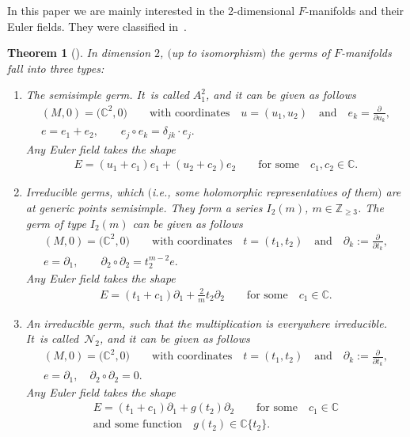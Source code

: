 \documentclass[10pt,a4paper]{amsart}
\numberwithin{equation}{section}
\numberwithin{figure}{section}
\newcommand{\Z}{{\mathbb Z}}
\newcommand{\C}{{\mathbb C}}
\newcommand{\NN}{{\mathcal N}}
\newcommand{\paa}{\partial}
\newtheorem{Theorem}{Theorem}[section]
\begin{document}
In this paper we are mainly interested in the 2-dimensional
$F$-manifolds and their Euler fields.
They were classified in~\cite{He02}.

\begin{Theorem}[{\cite[Theorem~4.7]{He02}}]\label{t2.2}
In dimension $2$, $($up to isomorphism$)$ the germs of
$F$-manifolds fall into three types:
\begin{enumerate}\itemsep=0pt
\item[$(a)$] The semisimple germ. It~is called $A_1^2$,
and it can be given as follows
\begin{gather*}
(M,0)=\big(\C^2,0\big)\qquad\text{with coordinates}\quad
u=(u_1,u_2)\quad\text{and}\quad e_k=\frac{\paa}{\paa u_k},
\\
e= e_1+e_2,\qquad e_j\circ e_k=\delta_{jk}\cdot e_j.
\end{gather*}
Any Euler field takes the shape
\begin{gather}\label{2.3}
E= (u_1+c_1)e_1+(u_2+c_2)e_2\qquad\text{for some}\quad
c_1,c_2\in\C.
\end{gather}

\item[$(b)$] Irreducible germs, which $($i.e., some holomorphic
representatives of them$)$ are at generic points semisimple.
They form a series $I_2(m)$, $m\in\Z_{\geq 3}$.
The germ of type $I_2(m)$ can be given as follows
\begin{gather*}
(M,0)=\big(\C^2,0\big)\qquad \text{with coordinates}\quad t=(t_1,t_2)\quad
\text{and}\quad\paa_k:=\frac{\paa}{\paa t_k},
\\
e=\paa_1,\qquad \paa_2\circ\paa_2 =t_2^{m-2}e.\label{2.4}
\end{gather*}
Any Euler field takes the shape
\begin{gather*}%
E= (t_1+c_1)\paa_1 + \frac{2}{m}t_2\paa_2
\qquad\text{for some}\quad c_1\in\C.
\end{gather*}

\item[$(c)$] An irreducible germ, such that the multiplication is
everywhere irreducible. It~is called~$\NN_2$, and it
can be given as follows
\begin{gather*}
(M,0)=\big(\C^2,0\big)\qquad \text{with coordinates}\quad t=(t_1,t_2)
\quad \text{and}\quad
\paa_k:=\frac{\paa}{\paa t_k},\\
e=\paa_1,\quad \paa_2\circ\paa_2 =0.%
\end{gather*}
Any Euler field takes the shape
\begin{gather}
E= (t_1+c_1)\paa_1 + g(t_2)\paa_2
\qquad\text{for some}\quad c_1\in\C\nonumber
\\
\text{and some function}\quad
g(t_2)\in\C\{t_2\}.\label{2.7}
\end{gather}
\end{enumerate}
\end{Theorem}
\end{document}

